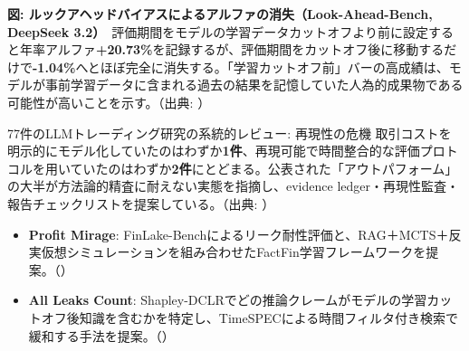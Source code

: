 \begin{center}
\end{center}
{\small\color{brandgray}\textbf{図: ルックアヘッドバイアスによるアルファの消失（Look-Ahead-Bench, DeepSeek 3.2）}\ 評価期間をモデルの学習データカットオフより前に設定すると年率アルファ\textbf{+20.73\%}を記録するが、評価期間をカットオフ後に移動するだけで\textbf{-1.04\%}へとほぼ完全に消失する。「学習カットオフ前」バーの高成績は、モデルが事前学習データに含まれる過去の結果を記憶していた人為的成果物である可能性が高いことを示す。（出典: \cite{lookaheadbench2026}）}

\begin{casestudy}{77件のLLMトレーディング研究の系統的レビュー: 再現性の危機}
取引コストを明示的にモデル化していたのはわずか\textbf{1件}、再現可能で時間整合的な評価プロトコルを用いていたのはわずか\textbf{2件}にとどまる。公表された「アウトパフォーム」の大半が方法論的精査に耐えない実態を指摘し、evidence ledger・再現性監査・報告チェックリストを提案している。（出典: \cite{agentictrading2026}）
\end{casestudy}

\begin{itemize}
  \item \textbf{Profit Mirage}: FinLake-Benchによるリーク耐性評価と、RAG＋MCTS＋反実仮想シミュレーションを組み合わせたFactFin学習フレームワークを提案。（\cite{profitmirage2025}）
  \item \textbf{All Leaks Count}: Shapley-DCLRでどの推論クレームがモデルの学習カットオフ後知識を含むかを特定し、TimeSPECによる時間フィルタ付き検索で緩和する手法を提案。（\cite{allleakscount2026}）
\end{itemize}

